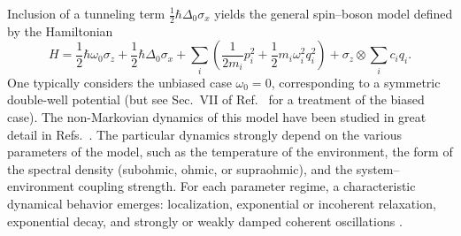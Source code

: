 \documentclass[3p,sort&compress]{elsarticle}
\begin{document}
Inclusion of a tunneling term $\frac{1}{2} \hbar\Delta_0 \sigma_x$ yields the general spin--boson model defined by the
Hamiltonian
%
\begin{equation}\label{eq:h-sbhdcskgsf}
H = \frac{1}{2} \hbar\omega_0 \sigma_z + 
\frac{1}{2} \hbar\Delta_0 \sigma_x 
+  \sum_i \left( \frac{1}{2m_i} p_i^2 + \frac{1}{2} m_i \omega_i^2 q_i^2 
   \right) + \sigma_z \otimes \sum_i
  c_i q_i.
\end{equation}
%
One typically considers the unbiased case $\omega_0=0$, corresponding to a symmetric double-well potential (but see Sec.~VII of Ref.~\cite{Leggett:1987:pm} for a treatment of the biased case). The non-Markovian dynamics of this model have been studied in great detail in Refs.~\cite{Leggett:1987:pm,Weiss:1999:tv}. The particular dynamics strongly depend on the various parameters of the model, such as the temperature of the environment, the form of the spectral density (subohmic, ohmic, or supraohmic), and the system--environment coupling strength. For each parameter regime, a characteristic dynamical behavior emerges: localization, exponential or incoherent relaxation, exponential decay, and strongly or weakly damped coherent oscillations \cite{Leggett:1987:pm}.
\end{document}
